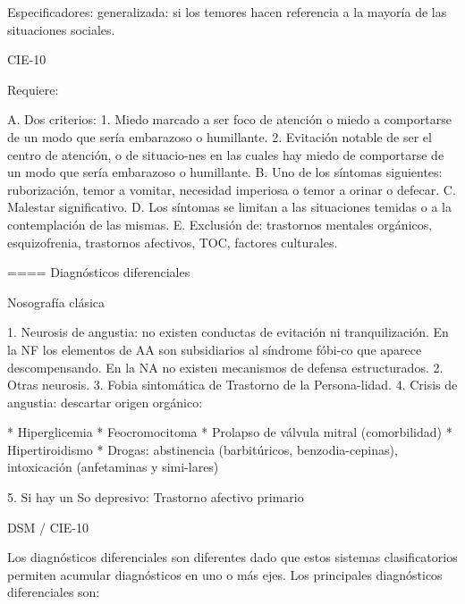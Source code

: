 Especificadores: generalizada: si los temores hacen referencia a la mayoría de las situaciones sociales.

CIE-10

Requiere:

A. Dos criterios:
1. Miedo marcado a ser foco de atención o miedo a comportarse de un modo que sería embarazoso o humillante.
2. Evitación notable de ser el centro de atención, o de situacio-nes en las cuales hay miedo de comportarse de un modo que sería embarazoso o humillante.
B. Uno de los síntomas siguientes: ruborización, temor a vomitar, necesidad imperiosa o temor a orinar o defecar.
C. Malestar significativo.
D. Los síntomas se limitan a las situaciones temidas o a la contemplación de las mismas.
E. Exclusión de: trastornos mentales orgánicos, esquizofrenia, trastornos afectivos, TOC, factores culturales.

==== Diagnósticos diferenciales

Nosografía clásica

1. Neurosis de angustia: no existen conductas de evitación ni tranquilización. En la NF los elementos de AA son subsidiarios al síndrome fóbi-co que aparece descompensando. En la NA no existen mecanismos de defensa estructurados.
2. Otras neurosis.
3. Fobia sintomática de Trastorno de la Persona-lidad.
4. Crisis de angustia: descartar origen orgánico:

* Hiperglicemia
* Feocromocitoma
* Prolapso de válvula mitral (comorbilidad)
* Hipertiroidismo
* Drogas: abstinencia (barbitúricos, benzodia-cepinas), intoxicación (anfetaminas y simi-lares)

5. Si hay un So depresivo: Trastorno afectivo primario

DSM / CIE-10

Los diagnósticos diferenciales son diferentes dado que estos sistemas clasificatorios permiten acumular diagnósticos en uno o más ejes. Los principales diagnósticos diferenciales son:

